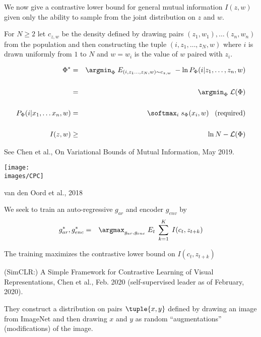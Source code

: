 {We now give a contrastive lower bound for general mutual information $I(z,w)$ given only the ability to sample from the joint distribution on $z$ and $w$.

\vfill
For $N \geq 2$ let {\color{red} $c_{z,w}$} be the density defined by drawing pairs $(z_1,w_1), \ldots (z_n,w_n)$ from the population
and then constructing the tuple $(i,z_1,\ldots,z_N,w)$ where $i$ is drawn uniformly from $1$ to $N$ and $w = w_i$ is the value of $w$ paired with $z_i$.


{\huge
\begin{eqnarray*}
\Phi^* & = & \argmin_\Phi \;E_{(i,z_1\ldots,z_N,w) \sim c_{z,w}}\;-\ln P_\Phi(i|z_1,\ldots,z_n,w) \\
\\
& = & \argmin_\Phi\;{\cal L}(\Phi) \\
\\
P_\Phi(i|x_1,\ldots x_n,w) & = & \softmax_i\;s_\Phi(x_i,w) \;\;\;\mbox{(required)} \\
\\
I(z,w) & \geq & \ln N - {\cal L}(\Phi)
\end{eqnarray*}
}

See Chen et al., On Variational Bounds of Mutual Information, May 2019.


{\huge

\centerline{\texttt{[image: \\images/CPC]}}

\centerline{van den Oord et al., 2018}

\vfill

We seek to train an auto-regressive $g_{ar}$ and encoder $g_{env}$ by
\begin{eqnarray*}
g_{ar}^*,g_{enc}^* & = & \argmax_{g_{ar},g_{enc}}\;E_t  \;\sum_{k=1}^K \;I(c_t,z_{t+k})
\end{eqnarray*}
}

\vfill
The training maximizes the contrastive lower bound on $I(c_t,z_{t+k})$


(SimCLR:) A Simple Framework for Contrastive Learning of Visual Representations, Chen et al., Feb. 2020 (self-supervised leader as of February, 2020).

\vfill
They construct a distribution on pairs $\tuple{x,y}$ defined by drawing an image from ImageNet and then drawing $x$ and $y$ as random ``augmentations'' (modifications) of the image.

}
